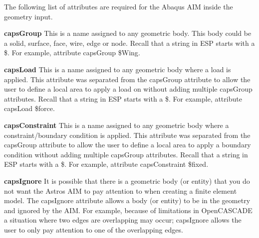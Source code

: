 The following list of attributes are required for the Abaqus AIM inside the geometry input.


\begin{DoxyItemize}
\item {\bfseries{ caps\+Group}} This is a name assigned to any geometric body. This body could be a solid, surface, face, wire, edge or node. Recall that a string in ESP starts with a \$. For example, attribute {\ttfamily caps\+Group \$\+Wing}.
\item {\bfseries{ caps\+Load}} This is a name assigned to any geometric body where a load is applied. This attribute was separated from the {\ttfamily caps\+Group} attribute to allow the user to define a local area to apply a load on without adding multiple {\ttfamily caps\+Group} attributes. Recall that a string in ESP starts with a \$. For example, attribute {\ttfamily caps\+Load \$force}.
\item {\bfseries{ caps\+Constraint}} This is a name assigned to any geometric body where a constraint/boundary condition is applied. This attribute was separated from the {\ttfamily caps\+Group} attribute to allow the user to define a local area to apply a boundary condition without adding multiple {\ttfamily caps\+Group} attributes. Recall that a string in ESP starts with a \$. For example, attribute {\ttfamily caps\+Constraint \$fixed}.
\item {\bfseries{ caps\+Ignore}} It is possible that there is a geometric body (or entity) that you do not want the Astros AIM to pay attention to when creating a finite element model. The caps\+Ignore attribute allows a body (or entity) to be in the geometry and ignored by the AIM. For example, because of limitations in Open\+CASCADE a situation where two edges are overlapping may occur; caps\+Ignore allows the user to only pay attention to one of the overlapping edges. 
\end{DoxyItemize}